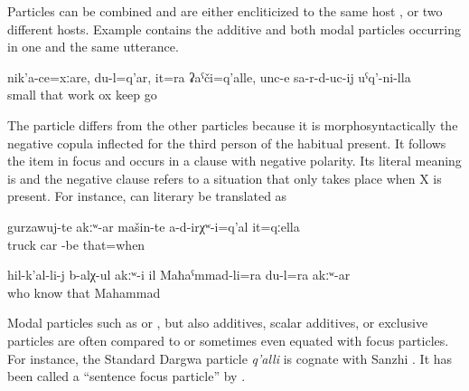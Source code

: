 Particles can be combined and are either encliticized to the same host ,  or two different hosts. Example  contains the additive and both modal particles occurring in one and the same utterance.
%
\begin{exe}
	\ex	\label{ex:‎Although I was little, I myself went behind the oxen, this is also work}
	\gll	nik'a-ce=xːare,	du-l=q'ar, it=ra	ʡaˁči=q'alle,	unc-e	sa-r-d-uc-ij	uˁq'-ni-lla\\
		small		that	work	ox	keep		go\\
	\glt	{}
\end{exe}

The particle   differs from the other particles because it is morphosyntactically the negative copula inflected for the third person of the habitual present. It follows the item in focus and occurs in a clause with negative polarity. Its literal meaning is  and the negative clause refers to a situation that only takes place when X is present. For instance,  can literary be translated as 
%
\begin{exe}
	\ex	\label{ex:At that time there were only trucks constituents}
	\gll	gurzawuj-te	akːʷ-ar	mašin-te	a-d-irχʷ-i=q'al	it=qːella\\
		truck 		car	-be	that=when\\
	\glt	{} 

	\ex	\label{ex:‎Nobody knew it, only Mahammad and me}
	\gll	hil-k'al-li-j	b-alχ-ul	akːʷ-i	il	Maħaˁmmad-li=ra	du-l=ra	akːʷ-ar\\
		who know		that	Mahammad		\\
	\glt	{}
\end{exe}

Modal particles such as  or , but also additives, scalar additives, or exclusive particles are often compared to or sometimes even equated with focus particles. For instance, the Standard Dargwa particle \textit{q'alli} is cognate with Sanzhi . It has been called a ``sentence focus particle'' by \citet[74]{vandenBerg2001}.

